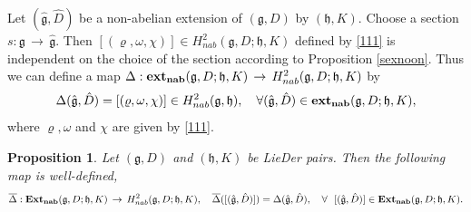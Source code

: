 \documentclass[12pt]{amsart}
\newtheorem{pro}[thm]{Proposition}
\newcommand{\lon }{\,\rightarrow\,}
\newcommand{\g}{\mathfrak g}
\newcommand{\h}{\mathfrak h}
\begin{document}
Let $(\hat{\g}, \hat{D})$ be a non-abelian extension of $(\g, D)$ by $(\h, K)$. Choose a section $s:\g\lon\hat{\g}$. Then $[(\varrho, \omega, \chi)]\in H^2_{nab}(\g,D;\h, K)$ defined by \eqref{111} is independent on the choice of the section according to Proposition \ref{sexnoon}. Thus we can define a map $\Delta:{\rm{\bf ext_{nab}}}(\g, D; \h, K)\lon H^2_{nab}(\g,D;\h,K)$ by
\begin{equation}\label{3333}
\Delta(\hat{\g}, \hat{D})=[(\varrho, \omega, \chi)]\in H^2_{nab}(\g, \h), \quad \forall (\hat{\g}, \hat{D})\in{\rm{\bf ext_{nab}}}(\g, D; \h, K),
\end{equation}
where $\varrho, \omega$ and $\chi$ are given by \eqref{111}.
\begin{pro}\label{pro11}
Let $(\g, D)$ and $(\h, K)$ be {\rm LieDer} pairs. Then the following map is well-defined,
$$
\overline{\Delta}: {\rm{\bf Ext_{nab}}}(\g, D; \h, K)\lon H^2_{nab}(\g,D;\h, K),\quad \overline{\Delta}([(\hat{\g}, \hat{D})])=\Delta(\hat{\g}, \hat{D}), \quad \forall~~ [(\hat{\g}, \hat{D})]\in{\rm{\bf Ext_{nab}}}(\g, D; \h, K).
$$
\end{pro}
\end{document}
